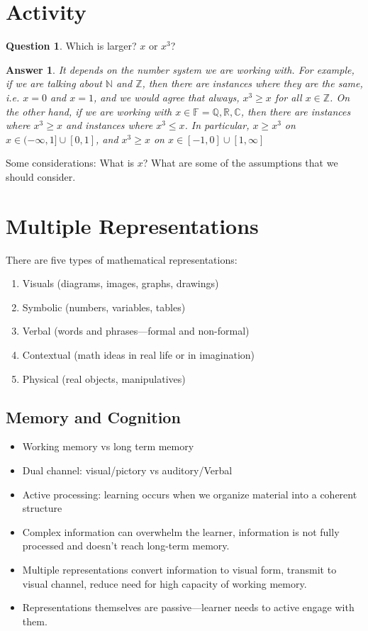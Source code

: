\documentclass[11pt]{article}
\theoremstyle{theorem}\newtheorem*{task}{Task}
\theoremstyle{theorem}\newtheorem*{example}{Example}
\theoremstyle{theorem}\newtheorem*{answer}{Answer}
\theoremstyle{definition}\newtheorem*{solution}{Solution}
\theoremstyle{theorem}\newtheorem*{prompt}{Prompt}
\theoremstyle{theorem}\newtheorem*{question}{Question}
\begin{document}
\section{Activity}

\begin{question}
    Which is larger? $x$ or $x^3$?
\end{question}

\begin{answer}
    It depends on the number system we are working with. For example, if we are talking about $\mathbb{N}$ and $\mathbb{Z}$, then there are instances where they are the same, i.e. $x = 0$ and $x = 1$, and we would agree that always, $x^3 \geq x$ for all $x \in \mathbb{Z}$. On the other hand, if we are working with $x \in \mathbb{F} = \mathbb{Q}, \mathbb{R}, \mathbb{C}$, then there are instances where $x^3 \geq x$ and instances where $x^3 \leq x$. In particular, $x \geq x^3$ on $x \in (-\infty, 1] \cup [0, 1]$, and $x^3 \geq x$ on $x \in [-1, 0] \cup [1, \infty]$
\end{answer}

Some considerations: What is $x$? What are some of the assumptions that we should consider.

\section{Multiple Representations}

There are five types of mathematical representations:
\begin{enumerate}
    \item Visuals (diagrams, images, graphs, drawings)
    \item Symbolic (numbers, variables, tables)
    \item Verbal (words and phrases---formal and non-formal)
    \item Contextual (math ideas in real life or in imagination)
    \item Physical (real objects, manipulatives)
\end{enumerate}

\subsection{Memory and Cognition}
\begin{itemize}
    \item Working memory vs long term memory
    \item Dual channel: visual/pictory vs auditory/Verbal
    \item Active processing: learning occurs when we organize material into a coherent structure
    \item Complex information can overwhelm the learner, information is not fully processed and doesn't reach long-term memory.
    \item Multiple representations convert information to visual form, transmit to visual channel, reduce need for high capacity of working memory.
    \item Representations themselves are passive---learner needs to active engage with them.
\end{itemize}
\end{document}
